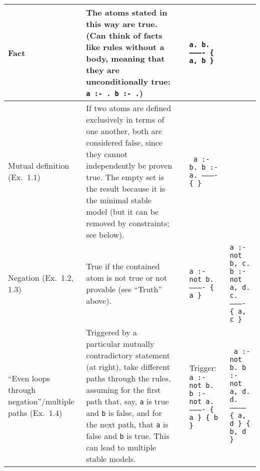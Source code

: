 \documentclass[10pt,a4paper,landscape]{article}
\begin{document}
\begin{longtable}{p{3cm}p{14cm}lp{3.5cm}p{3.5cm}}
	Fact 
		& The atoms stated in this way are true. (Can think of facts like rules without a body, meaning that they are unconditionally true: \texttt{a :- . b :- .})
		&& \texttt{a. \newline
				b. \newline
			 	---------- \newline
		 		\{ a, b \} } &\\ \midrule
	
	Mutual definition \newline (Ex.\ 1.1)
		& If two atoms are defined exclusively in terms of one another, both are considered false, since they cannot independently be proven true.
		The empty set is the result because it is the minimal stable model (but it can be removed by constraints; see below).
		&& \texttt{%
			a :- b. \newline
			b :- a. \newline
			---------- \newline				
		 	\{ \} } &\\ \midrule
	
	Negation \newline (Ex.\ 1.2, 1.3)
		& True if the contained atom is not true or not provable (see ``Truth'' above).
		&& \texttt{a :- not b. \newline
				  ---------- \newline
			  	  \{ a \} } 
		& \texttt{a :- not b, c. \newline
				b :- not a, d. \newline
				c. \newline
				---------- \newline
				\{ a, c \}} \\ \midrule
		
	``Even loops \newline through negation''\slash \newline multiple paths \newline (Ex.\ 1.4)
		& Triggered by a particular mutually contradictory statement (at right), take different paths through the rules, assuming for the first path that, say, \texttt{a} is true and \texttt{b} is false, and for the next path, that \texttt{a} is false and \texttt{b} is true.
		This can lead to multiple stable models.

		&& Trigger: \newline
		\texttt{%
			a :- not b. \newline
			b :- not a. \newline
			---------- \newline
			\{ a \} \newline
			\{ b \}}
		& \texttt{%
			a :- not b. \newline
			b :- not a, d. \newline
			d. \newline
			----------- \newline
			\{ a, d \} \newline
			\{ b, d \}} \newline \\ %
		


\end{longtable}
\end{document}
